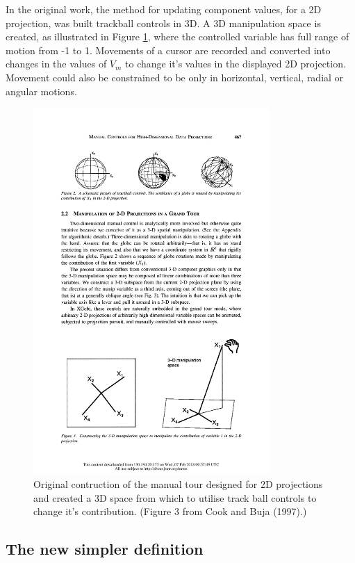 \documentclass[]{interact}
\theoremstyle{plain}%
\theoremstyle{definition}
\theoremstyle{remark}
\begin{document}
In the original work, the method for updating component values, for a 2D
projection, was built trackball controls in 3D. A 3D manipulation space
is created, as illustrated in Figure \ref{manipspace}, where the
controlled variable has full range of motion from -1 to 1. Movements of
a cursor are recorded and converted into changes in the values of
\(V_m\) to change it's values in the displayed 2D projection. Movement
could also be constrained to be only in horizontal, vertical, radial or
angular motions.

\begin{figure}[ht]
\centerline{\includegraphics[width=0.8\textwidth]{figures/manip_space.pdf}}
\caption{Original contruction of the manual tour designed for 2D projections and created a 3D space from which to utilise track ball controls to change it's contribution. (Figure 3 from Cook and Buja (1997).)}
\label{manipspace}
\end{figure}

\hypertarget{the-new-simpler-definition}{%
\subsection{The new simpler
definition}\label{the-new-simpler-definition}}
\end{document}
